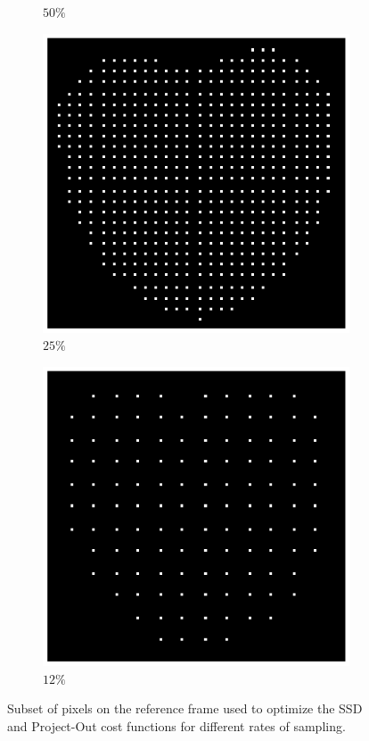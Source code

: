 \begin{figure}[t!]
\begin{subfigure}{0.16\textwidth}
		\caption{$50\%$}
		\label{fig:sampling_50}
	\end{subfigure}
	\begin{subfigure}{0.16\textwidth}
		\includegraphics[width=\textwidth]{figures/sampling_25.png}
		\caption{$25\%$}
		\label{fig:sampling_25}
	\end{subfigure}
	\begin{subfigure}{0.16\textwidth}
		\includegraphics[width=\textwidth]{figures/sampling_12.png}
		\caption{$12\%$}
		\label{fig:ini_3}
	\end{subfigure}
	\caption{Subset of pixels on the reference frame used to optimize the SSD and Project-Out cost functions for different rates of sampling.}
    \label{fig:sampling_12}
\end{figure}

